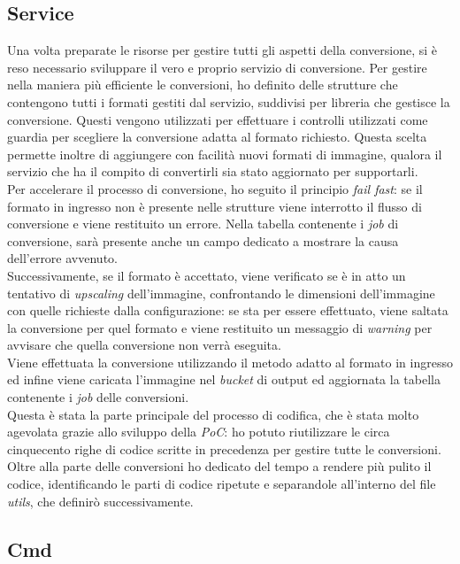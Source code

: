 \subsection{Service}

Una volta preparate le risorse per gestire tutti gli aspetti della conversione,
si è reso necessario sviluppare il vero e proprio servizio di conversione.
Per gestire nella maniera più efficiente le conversioni, ho definito delle strutture che contengono tutti i formati gestiti dal
servizio, suddivisi per libreria che gestisce la conversione. Questi vengono
utilizzati per effettuare i controlli utilizzati come guardia per scegliere la
conversione adatta al formato richiesto. Questa scelta permette inoltre di
aggiungere con facilità nuovi formati di immagine, qualora il servizio che ha il
compito di convertirli sia stato aggiornato per supportarli. \\
Per accelerare il processo di
conversione, ho seguito il principio \emph{fail fast}: se il formato in ingresso
non è presente nelle strutture viene interrotto il flusso di conversione e viene restituito un
errore. Nella tabella contenente i \emph{job} di conversione, sarà presente
anche un campo dedicato a mostrare la causa dell'errore avvenuto.\\
Successivamente, se il formato è accettato, viene verificato se è in atto un tentativo di
\emph{upscaling} dell'immagine, confrontando le dimensioni dell'immagine con
quelle richieste dalla configurazione: se sta per essere effettuato, viene
saltata la conversione per quel formato e viene restituito un messaggio di
\emph{warning} per avvisare che quella conversione non verrà eseguita.\\
Viene effettuata la conversione utilizzando il metodo adatto al formato in
ingresso ed infine viene caricata l'immagine nel \emph{bucket} di output ed
aggiornata la tabella contenente i \emph{job} delle conversioni.\\
Questa è stata la parte principale del processo di codifica, che è stata molto
agevolata grazie allo sviluppo della \emph{PoC}: ho potuto riutilizzare le circa
cinquecento righe di codice scritte in precedenza per gestire tutte le
conversioni. Oltre alla parte delle conversioni ho dedicato del tempo a rendere
più pulito il codice, identificando le parti di codice ripetute e separandole
all'interno del file \emph{utils}, che definirò successivamente.

\subsection{Cmd}

